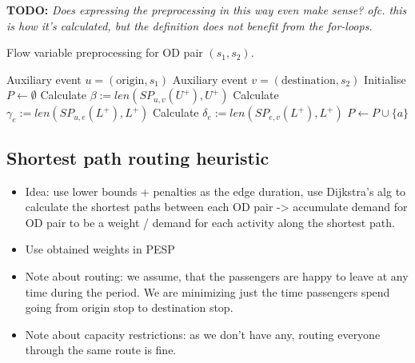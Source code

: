 \documentclass[english, 12pt, a4paper, sci, utf8, a-2b, online]{aaltothesis}
\begin{document}
{
    \color{red}
    \textbf{TODO:} \textit{Does expressing the preprocessing in this way even make sense? ofc. this is how it's calculated, but the definition does not benefit from the for-loops.}
}
\begin{algorithm}
    \caption{Flow variable preprocessing for OD pair $(s_1, s_2)$.}
    \label{alg:preprocessing}
    \begin{algorithmic}
        \State Auxiliary event $u = (\text{origin}, s_1)$
        \State Auxiliary event $v = (\text{destination}, s_2)$
        \State Initialise $P \gets \emptyset$
        \State Calculate $\beta := len(SP_{u,v}(U^+), U^+)$
            \State Calculate $\gamma_e := len(SP_{u,e}(L^+), L^+)$
            \State Calculate $\delta_e := len(SP_{e,v}(L^+), L^+)$
        \EndFor
                \State $P \gets P \cup \{a\}$
            \EndIf
        \EndFor
    \end{algorithmic}
\end{algorithm}
    
\subsection{Shortest path routing heuristic}

\begin{itemize}
    \item Idea: use lower bounds + penalties as the edge duration, use Dijkstra's alg to calculate the shortest paths between each OD pair -> accumulate demand for OD pair to be a weight / demand for each activity along the shortest path.
    \item Use obtained weights in PESP
    \item Note about routing: we assume, that the passengers are happy to leave at any time during the period. We are minimizing just the time passengers spend going from origin stop to destination stop.
    \item Note about capacity restrictions: as we don't have any, routing everyone through the same route is fine.
\end{itemize}
\end{document}
